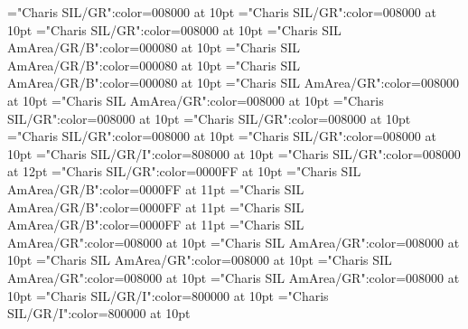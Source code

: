 \documentclass[a4paper,twoside]{article}
\begin{document}
\font\spansensespanspanentryletDatadicBody="Charis SIL/GR":color=008000 at 10pt
\font\spanspansensespanspanentryletDatadicBody="Charis SIL/GR":color=008000 at 10pt
\font\spanspanspansensespanspanentryletDatadicBody="Charis SIL/GR":color=008000 at 10pt
\font\spanmxbspanspanspansensespanspanentryletDatadicBody="Charis SIL AmArea/GR/B":color=000080 at 10pt
\font\spanexampleexamplescontentssensesensecontentsensesentryspanmxbspanspanspansensespanspanentryletDatadicBody="Charis SIL AmArea/GR/B":color=000080 at 10pt
\font\spanexampleexamplescontentssensesensecontentsensesentryspanspanspansensespanspanentryletDatadicBody="Charis SIL AmArea/GR/B":color=000080 at 10pt
\font\spanspanspanspansensespanspanentryletDatadicBody="Charis SIL AmArea/GR":color=008000 at 10pt
\font\spanspanspanspanspansensespanspanentryletDatadicBody="Charis SIL AmArea/GR":color=008000 at 10pt
\font\spanesspanspanspanspanspansensespanspanentryletDatadicBody="Charis SIL/GR":color=008000 at 10pt
\font\spanspanesspanspanspanspanspansensespanspanentryletDatadicBody="Charis SIL/GR":color=008000 at 10pt
\font\spanspanspanspanspanspansensespanspanentryletDatadicBody="Charis SIL/GR":color=008000 at 10pt
\font\spanesspanesspanspanspanspanspansensespanspanentryletDatadicBody="Charis SIL/GR":color=008000 at 10pt
\font\translationstesspanesspanspanspanspanspansensespanspanentryletDatadicBody="Charis SIL/GR/I":color=808000 at 10pt
\font\minorentryvariantletDatadicBody="Charis SIL/GR":color=008000 at 12pt
\font\headwordminorentryvariantletDatadicBody="Charis SIL/GR":color=0000FF at 10pt
\font\spanmxbheadwordminorentryvariantletDatadicBody="Charis SIL AmArea/GR/B":color=0000FF at 11pt
\font\aspanmxbheadwordminorentryvariantletDatadicBody="Charis SIL AmArea/GR/B":color=0000FF at 11pt
\font\spanheadwordminorentryvariantheadwordminorentryvariantletDatadicBody="Charis SIL AmArea/GR/B":color=0000FF at 11pt
\font\spanminorentryvariantletDatadicBody="Charis SIL AmArea/GR":color=008000 at 10pt
\font\spanspanminorentryvariantletDatadicBody="Charis SIL AmArea/GR":color=008000 at 10pt
\font\spanspanspanminorentryvariantletDatadicBody="Charis SIL AmArea/GR":color=008000 at 10pt
\font\spanspanspanspanminorentryvariantletDatadicBody="Charis SIL AmArea/GR":color=008000 at 10pt
\font\spanspanspanspanspanminorentryvariantletDatadicBody="Charis SIL AmArea/GR":color=008000 at 10pt
\font\spanesspanspanspanspanspanminorentryvariantletDatadicBody="Charis SIL/GR/I":color=800000 at 10pt
\font\spanreverseabbrvariantentrytypesvisiblevariantentryrefsminorentryvariantspanspanspanspanspanminorentryvariantletDatadicBody="Charis SIL/GR/I":color=800000 at 10pt
\end{document}
